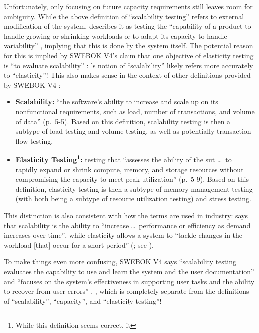 Unfortunately, only focusing on future capacity requirements still leaves room
for ambiguity. While the above definition of ``scalability testing'' refers to
external modification of the system, \citeauthor{ISO_IEC2023a} describes it as
testing the ``capability of a product to handle growing or shrinking
workloads or to adapt its capacity to handle variability''
\citeyearpar{ISO_IEC2023a}, implying that this is done by the system itself.
The potential reason for this is implied by SWEBOK V4's claim that one
objective of elasticity testing is ``to evaluate scalability''
\citep[p.~5-9]{SWEBOK2024}: \citeauthor{ISO_IEC2023a}'s notion of ``scalability''
likely refers more accurately to ``elasticity''! This also makes sense in the
context of other definitions provided by SWEBOK V4 \citep{SWEBOK2024}:
\begin{itemize}
      \item \textbf{Scalability:} ``the software's ability to increase and
            scale up on its nonfunctional requirements, such as load, number of
            transactions, and volume of data'' (p.~5-5). Based on this
            definition, scalability testing is then a subtype of load testing
            and volume testing, as well as potentially transaction flow testing.
      \item \textbf{Elasticity Testing\footnote{While this definition seems
                        correct, it \swebokElasRef{}}:} testing that ``assesses
            the ability of the \acs{sut} \dots\ to rapidly expand or shrink
            compute, memory, and storage resources without compromising the
            capacity to meet peak utilization'' (p.~5-9). Based on this
            definition, elasticity testing is then a subtype of memory
            management testing (with both being a subtype of resource
            utilization testing) and stress testing.
\end{itemize}
This distinction is also consistent with how the terms are used in industry:
\citeauthor{Pandey2023} says that scalability is the ability to ``increase
\dots\ performance or efficiency as demand increases over time'', while
elasticity allows a system to ``tackle changes in the workload [that] occur for
a short period'' (\citeyear{Pandey2023}; see ).

To make things even more confusing, SWEBOK V4 says ``scalability
testing evaluates the capability to use and learn the system and the user
documentation'' and ``focuses on the system's effectiveness in supporting user
tasks and the ability to recover from user errors'' \citep[p.~5-9]{SWEBOK2024}.
\swebokScalDef{}, which is completely separate from the definitions of
``scalability'', ``capacity'', and ``elasticity testing''!

